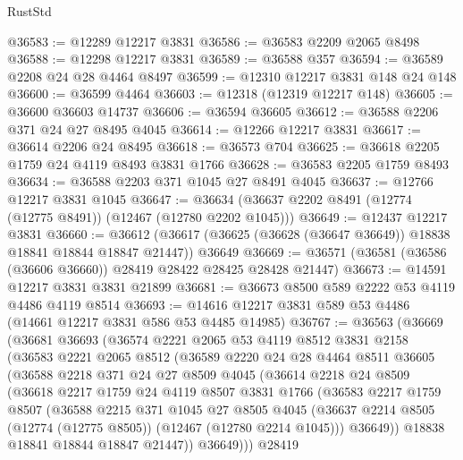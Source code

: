 \begin{lexlean}{RustStd}
\begin{coremodule}
@36583 := @12289 @12217 @3831
@36586 := @36583 @2209 @2065 @8498
@36588 := @12298 @12217 @3831
@36589 := @36588 @357
@36594 := @36589 @2208 @24 @28 @4464 @8497
@36599 := @12310 @12217 @3831 @148 @24 @148
@36600 := @36599 @4464
@36603 := @12318 (@12319 @12217 @148)
@36605 := @36600 @36603 @14737
@36606 := @36594 @36605
@36612 := @36588 @2206 @371 @24 @27 @8495 @4045
@36614 := @12266 @12217 @3831
@36617 := @36614 @2206 @24 @8495
@36618 := @36573 @704
@36625 := @36618 @2205 @1759 @24 @4119 @8493 @3831 @1766
@36628 := @36583 @2205 @1759 @8493
@36634 := @36588 @2203 @371 @1045 @27 @8491 @4045
@36637 := @12766 @12217 @3831 @1045
@36647 := @36634 (@36637 @2202 @8491 (@12774 (@12775 @8491)) (@12467 (@12780 @2202 @1045)))
@36649 := @12437 @12217 @3831
@36660 := @36612
    (@36617 (@36625 (@36628 (@36647 @36649)) @18838 @18841 @18844 @18847 @21447))
    @36649
@36669 := @36571 (@36581 (@36586 (@36606 @36660)) @28419 @28422 @28425 @28428 @21447)
@36673 := @14591 @12217 @3831 @3831 @21899
@36681 := @36673 @8500 @589 @2222 @53 @4119 @4486 @4119 @8514
@36693 := @14616 @12217 @3831 @589 @53 @4486 (@14661 @12217 @3831 @586 @53 @4485 @14985)
@36767 := @36563
    (@36669
      (@36681
        @36693
        (@36574
          @2221
          @2065
          @53
          @4119
          @8512
          @3831
          @2158
          (@36583
            @2221
            @2065
            @8512
            (@36589
              @2220
              @24
              @28
              @4464
              @8511
              @36605
              (@36588
                @2218
                @371
                @24
                @27
                @8509
                @4045
                (@36614
                  @2218
                  @24
                  @8509
                  (@36618
                    @2217
                    @1759
                    @24
                    @4119
                    @8507
                    @3831
                    @1766
                    (@36583
                      @2217
                      @1759
                      @8507
                      (@36588
                        @2215
                        @371
                        @1045
                        @27
                        @8505
                        @4045
                        (@36637 @2214 @8505 (@12774 (@12775 @8505)) (@12467 (@12780 @2214 @1045)))
                        @36649))
                    @18838
                    @18841
                    @18844
                    @18847
                    @21447))
                @36649)))
          @28419

\end{coremodule}
\end{lexlean}
